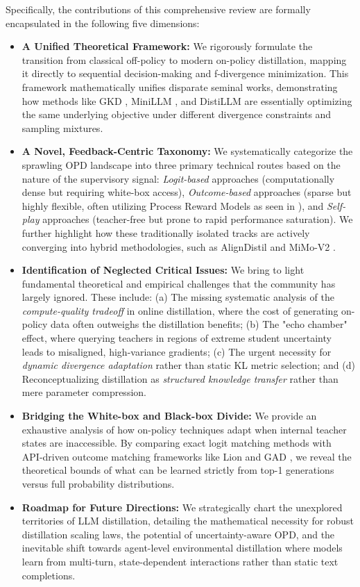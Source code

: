 Specifically, the contributions of this comprehensive review are formally encapsulated in the following five dimensions:
\begin{itemize}
    \item \textbf{A Unified Theoretical Framework:} We rigorously formulate the transition from classical off-policy to modern on-policy distillation, mapping it directly to sequential decision-making and f-divergence minimization. This framework mathematically unifies disparate seminal works, demonstrating how methods like GKD \citep{2306.13649}, MiniLLM \citep{2306.08543}, and DistiLLM \citep{2402.03898} are essentially optimizing the same underlying objective under different divergence constraints and sampling mixtures.
    \item \textbf{A Novel, Feedback-Centric Taxonomy:} We systematically categorize the sprawling OPD landscape into three primary technical routes based on the nature of the supervisory signal: \textit{Logit-based} approaches (computationally dense but requiring white-box access), \textit{Outcome-based} approaches (sparse but highly flexible, often utilizing Process Reward Models as seen in \citet{2305.20050}), and \textit{Self-play} approaches (teacher-free but prone to rapid performance saturation). We further highlight how these traditionally isolated tracks are actively converging into hybrid methodologies, such as AlignDistil \citep{2503.02832} and MiMo-V2 \citep{2601.02780}.
    \item \textbf{Identification of Neglected Critical Issues:} We bring to light fundamental theoretical and empirical challenges that the community has largely ignored. These include: (a) The missing systematic analysis of the \textit{compute-quality tradeoff} in online distillation, where the cost of generating on-policy data often outweighs the distillation benefits; (b) The "echo chamber" effect, where querying teachers in regions of extreme student uncertainty leads to misaligned, high-variance gradients; (c) The urgent necessity for \textit{dynamic divergence adaptation} rather than static KL metric selection; and (d) Reconceptualizing distillation as \textit{structured knowledge transfer} rather than mere parameter compression.
    \item \textbf{Bridging the White-box and Black-box Divide:} We provide an exhaustive analysis of how on-policy techniques adapt when internal teacher states are inaccessible. By comparing exact logit matching methods with API-driven outcome matching frameworks like Lion \citep{2310.01382} and GAD \citep{2511.10643}, we reveal the theoretical bounds of what can be learned strictly from top-1 generations versus full probability distributions.
    \item \textbf{Roadmap for Future Directions:} We strategically chart the unexplored territories of LLM distillation, detailing the mathematical necessity for robust distillation scaling laws, the potential of uncertainty-aware OPD, and the inevitable shift towards agent-level environmental distillation where models learn from multi-turn, state-dependent interactions rather than static text completions.
\end{itemize}

